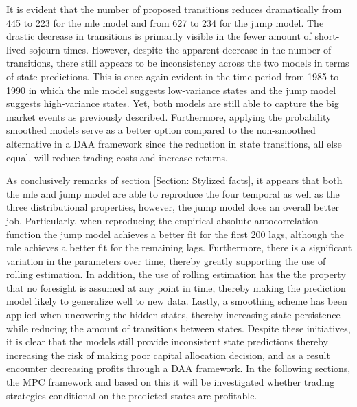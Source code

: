 It is evident that the number of proposed transitions reduces dramatically from 445 to 223 for the mle model and from 627 to 234 for the jump model. The drastic decrease in transitions is primarily visible in the fewer amount of short-lived sojourn times. However, despite the apparent decrease in the number of transitions, there still appears to be inconsistency across the two models in terms of state predictions. This is once again evident in the time period from 1985 to 1990 in which the mle model suggests low-variance states and the jump model suggests high-variance states. Yet, both models are still able to capture the big market events as previously described. Furthermore, applying the probability smoothed models serve as a better option compared to the non-smoothed alternative in a DAA framework since the reduction in state transitions, all else equal, will reduce trading costs and increase returns. 

As conclusively remarks of section \ref{Section: Stylized facts}, it appears that both the mle and jump model are able to reproduce the four temporal as well as the three distributional properties, however, the jump model does an overall better job. Particularly, when reproducing the empirical absolute autocorrelation function the jump model achieves a better fit for the first 200 lags, although the mle achieves a better fit for the remaining lags. Furthermore, there is a significant variation in the parameters over time, thereby greatly supporting the use of rolling estimation. In addition, the use of rolling estimation has the the property that no foresight is assumed at any point in time, thereby making the prediction model likely to generalize well to new data. Lastly, a smoothing scheme has been applied when uncovering the hidden states, thereby increasing state persistence while reducing the amount of transitions between states. Despite these initiatives, it is clear that the models still provide inconsistent state predictions thereby increasing the risk of making poor capital allocation decision, and as a result encounter decreasing profits through a DAA framework. In the following sections, the MPC framework and based on this it will be investigated whether trading strategies conditional on the predicted states are profitable.
